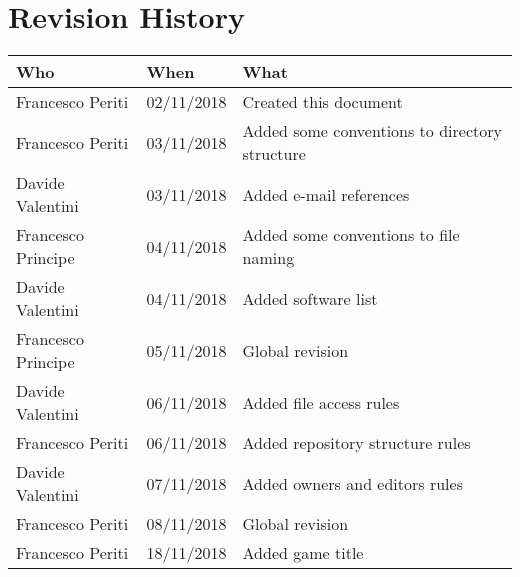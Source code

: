 \section*{Revision History}
\begin{table}[H]
\centering
  \begin{tabularx}{\textwidth}{|l|l|X|}
\hline
\cellcolor{lightgray}\textbf{Who} & \cellcolor{lightgray}\textbf{When} & \cellcolor{lightgray}\textbf{What} \\ \hline
Francesco Periti & 02/11/2018 & Created this document \\ \hline
Francesco Periti & 03/11/2018 & Added some conventions to directory structure \\ \hline
Davide Valentini & 03/11/2018 & Added e-mail references \\ \hline
Francesco Principe & 04/11/2018 & Added some conventions to file naming \\ \hline
Davide Valentini & 04/11/2018 & Added software list \\ \hline
Francesco Principe & 05/11/2018 & Global revision \\ \hline
Davide Valentini & 06/11/2018 & Added file access rules \\ \hline
Francesco Periti & 06/11/2018 & Added repository structure rules \\ \hline
Davide Valentini & 07/11/2018 & Added owners and editors rules \\ \hline
Francesco Periti & 08/11/2018 & Global revision \\ \hline
Francesco Periti & 18/11/2018 & Added game title \\ \hline
\end{tabularx}
\end{table}
